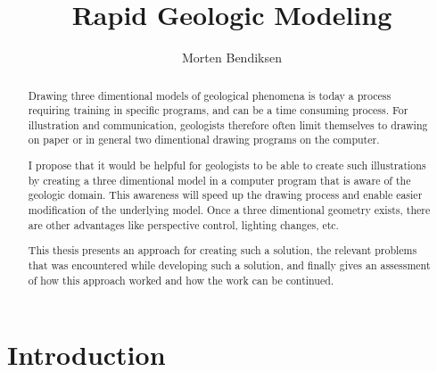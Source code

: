 \documentclass[a4paper,12pt]{article}
\title{Rapid Geologic Modeling}
\author{Morten Bendiksen}
\begin{document}
\onecolumn
\maketitle


\onecolumn
\begin{abstract}
Drawing three dimentional models of geological phenomena is today a process requiring training in specific programs, and can be a time consuming process. For illustration and communication, geologists therefore often limit themselves to drawing on paper or in general two dimentional drawing programs on the computer.

I propose that it would be helpful for geologists to be able to create such illustrations by creating a three dimentional model in a computer program that is aware of the geologic domain. This awareness will speed up the drawing process and enable easier modification of the underlying model. Once a three dimentional geometry exists, there are other advantages like perspective control, lighting changes, etc.

This thesis presents an approach for creating such a solution, the relevant problems that was encountered while developing such a solution, and finally gives an assessment of how this approach worked and how the work can be continued.
\end{abstract}

\onecolumn
\tableofcontents 



\onecolumn


\section{Introduction}
\label{sec:intro}


% 
% 	
% 	
	
\end{document}
